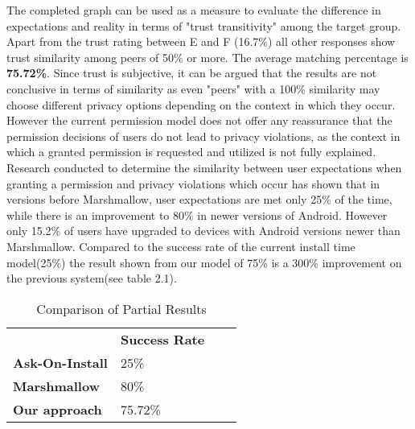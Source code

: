 The completed graph can be used as a measure to evaluate the difference in expectations and reality in terms of "trust transitivity" among the target group. Apart from the trust rating between E and F (16.7\%) all other responses show trust similarity among peers of 50\% or more. The average matching percentage is \textbf{75.72\%}. Since trust is subjective, it can be argued that the results are not conclusive in terms of similarity as even "peers" with a 100\% similarity may choose different privacy options depending on the context in which they occur. However the current permission model does not offer any reassurance that the permission decisions of users do not lead to privacy violations, as the context in which a granted permission is requested and utilized is not fully explained. Research\cite{wijesekera2015android} conducted to determine the similarity between user expectations when granting a permission and privacy violations which occur has shown that in versions before Marshmallow, user expectations are met only 25\% of the time, while there is an improvement to 80\% in newer versions of Android. However only 15.2\% of users have upgraded to devices with Android versions newer than Marshmallow\cite{androdashboard}. Compared to the success rate of the current install time model(25\%) the result shown from our model of 75\% is a 300\% improvement on the previous system(see table 2.1). 
\smallskip

\begin{table}[]
\centering
\begin{tabular}{|l|l|ll}
\cline{1-2}
                        & \textbf{Success Rate} &  &  \\ \cline{1-2}
\textbf{Ask-On-Install} & 25\%                  &  &  \\ \cline{1-2}
\textbf{Marshmallow}    & 80\%                  &  &  \\ \cline{1-2}
\textbf{Our approach}   & 75.72\%               &  &  \\ \cline{1-2}
\end{tabular}
\caption{Comparison of Partial Results}
\label{comp-results}
\end{table}


